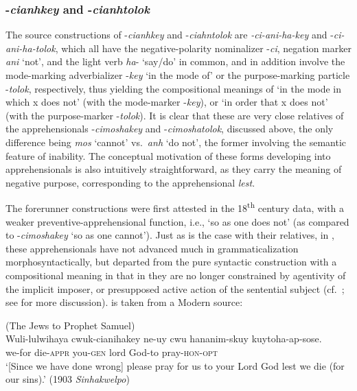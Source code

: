 \documentclass[output=paper,colorlinks,citecolor=brown]{langscibook}
\begin{document}
\subsubsection{-\textit{cianhkey} and -\textit{cianhtolok}}

The source constructions of \nobreakdash-\textit{cianhkey} and \nobreakdash-\textit{ciahntolok} are \textit{-ci-ani-ha-key} and  \nobreakdash-\textit{ci-ani-ha-tolok}, which all have the negative-polarity nominalizer \nobreakdash-\textit{ci}, negation marker \textit{ani} `not', and the light verb \textit{ha}- `say/do' in common, and in addition involve the mode-marking adverbializer \nobreakdash-\textit{key} `in the mode of' or the purpose-marking particle \nobreakdash-\textit{tolok}, respectively, thus yielding the compositional meanings of `in the mode in which x does not' (with the mode-marker \nobreakdash-\textit{key}), or `in order that x does not' (with the purpose-marker \nobreakdash-\textit{tolok}). It is clear that these are very close relatives of the apprehensionals \nobreakdash-\textit{cimoshakey} and \nobreakdash-\textit{cimoshatolok}, discussed above, the only difference being \textit{mos} `cannot' vs.\ \textit{anh} `do not', the former involving the semantic feature of inability. The conceptual motivation of these forms developing into apprehensionals is also intuitively straightforward, as they carry the meaning of negative purpose, corresponding to the  apprehensional \textit{lest}.

The forerunner constructions were first attested in the 18\textsuperscript{th} century data, with a weaker preventive-apprehensional function, i.e., `so as one does not' (as compared to \nobreakdash-\textit{cimoshakey} `so as one cannot'). Just as is the case with their relatives, in , these apprehensionals have not advanced much in grammaticalization morphosyntactically, but departed from the pure syntactic construction with a compositional meaning in that in  they are no longer constrained by agentivity of the implicit imposer, or presupposed active action of the sentential subject (cf.\ ; see  for more discussion).  is taken from a Modern  source:


\ea \label{ex:RK15} \textnormal{(The Jews to Prophet Samuel)}\\
\gll Wuli-lulwihaya cwuk-cianihakey ne-uy cwu hananim-skuy kuytoha-ap-sose. \\
we-for die-\textsc{appr} you-\textsc{gen} lord God-to pray-\textsc{hon}-\textsc{opt} \\
\glt `[Since we have done wrong] please pray for us to your Lord God lest we die (for our sins).' (1903 \textit{Sinhakwelpo})
\z
\end{document}

